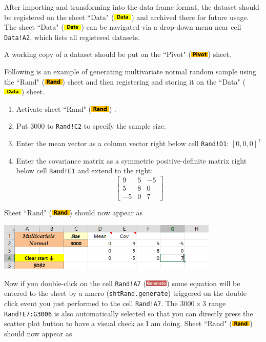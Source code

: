 \documentclass[article]{jss}
\newcommand{\shtData}{``Data" (\includegraphics[height=8pt, keepaspectratio=true]{DataSheetTab_png}) }
\newcommand{\shtRand}{``Rand" (\includegraphics[height=8pt, keepaspectratio=true]{RandSheetTab_png}) }
\newcommand{\shtPivot}{``Pivot" (\includegraphics[height=8pt, keepaspectratio=true]{PivotSheetTab_png}) }
\begin{document}
        After importing and transforming into the data frame format, the dataset should be registered on the sheet \shtData and archived there for future usage. The sheet \shtData can be navigated via a drop-down menu near cell \texttt{Data!A2}, which lists all registered datasets. 
        
        A working copy of a dataset should be put on the \shtPivot sheet.
        
        Following is an example of generating multivariate normal random sample using the \shtRand sheet and then registering and storing it on the \shtData sheet. \\
        \begin{enumerate}
        \item Activate sheet \shtRand.
        \item Put 3000 to \texttt{Rand!C2} to specify the sample size.
        \item Enter the mean vector as a column vector right below cell \texttt{Rand!D1}: $[0,0,0]^\intercal$
        \item Enter the covariance matrix as a symmetric positive-definite matrix right below cell \texttt{Rand!E1} and extend to the right:  
        \[\left[ {\begin{array}{*{20}{c}}
        9&5&-5 \\ 
        5&8&0 \\ 
        -5&0&7 
        \end{array}} \right]\]
        \end{enumerate}
        Sheet \shtRand should now appear as
        \begin{center}
        \includegraphics[height=64pt, keepaspectratio=true]{RandSheetAfterInput_png}
        \end{center}
        Now if you double-click on the cell \texttt{Rand!A7} (\includegraphics[height=8pt, keepaspectratio=true]{RandSheet_GenerateButton_png}) some equation will be entered to the sheet by a  macro (\texttt{shtRand.generate}) triggered on the double-click event you just performed to the cell \texttt{Rand!A7}. The $3000\times 3$ range \texttt{Rand!E7:G3006} is also automatically selected so that you can directly press the scatter plot button to have a visual check as I am doing. Sheet \shtRand should now appear as
\end{document}
